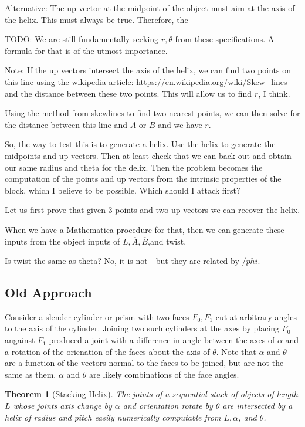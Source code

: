 \documentclass[11pt]{article}
\newtheorem{theorem}{Theorem}
\begin{document}
Alternative: The up vector at the midpoint of the object must aim at the
axis of the helix. This must always be true. Therefore, the 

TODO: We are still fundamentally seeking $r,\theta$ from these specifications.
A formula for that is of the utmost importance.

Note: If the up vectors intersect the axis of the helix, we can find two
points on this line using the wikipedia article: \url{https://en.wikipedia.org/wiki/Skew_lines}
and the distance between these two points. This will allow us to find $r$, I think.

Using the method from skewlines to find two nearest points, we can then solve for
the distance between this line and $A$ or $B$ and we have $r$.

So, the way to test this is to generate a helix. Use the helix to generate
the midpoints and up vectors. Then at least check that we can back out and
obtain our same radius and theta for the delix.  Then the problem becomes the
computation of the points and up vectors from the intrinsic properties of the block,
which I believe to be possible.  Which should I attack first?

Let us first prove that given 3 points and two up vectors we can recover the helix.

When we have a Mathematica procedure for that, then we can generate these inputs
from the object inputs of $L,\overline{A},\overline{B}$,and twist.

Is twist the same as theta? No, it is not---but they are related by $/phi$.



\subsection{Old Approach}


Consider a slender cylinder or prism with two faces $F_0,F_1$ cut at arbitrary angles to the axis of the cylinder.
Joining two such cylinders at the axes by placing $F_0$ angainst $F_1$ produced a joint with a difference in
angle between the axes of $\alpha$ and a rotation of the orienation of the faces about the axis of $\theta$.
Note that $\alpha$ and $\theta$ are a function of the vectors normal to the faces to be joined, but are not the same as them. $\alpha$ and $\theta$ are likely combinations of the face angles.

\begin{theorem}[Stacking Helix]
  The joints of a sequential stack of objects of length $L$ whose joints axis change by $\alpha$ and orientation rotate
  by $\theta$ are intersected by a helix of radius and pitch easily numerically computable
  from  $L,\alpha$, and $\theta$.
\end{theorem}
\end{document}
